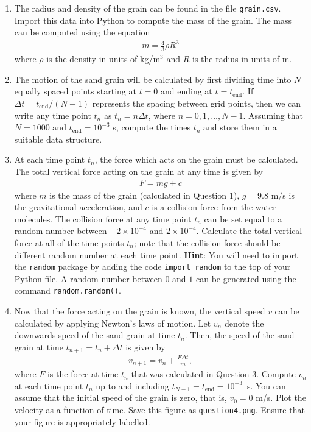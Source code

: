 \documentclass[11pt, a4paper]{article}
\begin{document}
\begin{enumerate}

\item{The radius
and density of the grain can be found in the file
{\tt grain.csv}.  Import this data into Python to
compute the mass of the grain.  The mass can be
computed using the equation
\begin{align}
m = \frac{4}{3} \rho R^3
\end{align}
where $\rho$ is the density in units of kg/m$^3$
and $R$ is the radius in units of m.} 

\item{The motion of the sand grain will be calculated by
first dividing
time into $N$ equally spaced points starting at $t = 0$ and ending at
$t = t_\text{end}$.  If $\Delta t = t_\text{end} / (N-1)$ represents the
spacing between grid points, then we can write any time point
$t_n$ as $t_n = n \Delta t$, where $n = 0, 1, \ldots, N-1$.  
Assuming that
$N = 1000$ and $t_\text{end} = 10^{-3}$ s, 
compute the times $t_n$
and store them in a suitable data structure.}

\item{At each time point $t_n$, the force which acts on the grain
must be calculated.  The total vertical force acting on the
grain at any time is given by
\begin{align}
F = m g + c \label{eqn:Fz}
\end{align}
where $m$ is the mass of the grain (calculated in Question 1), 
$g = 9.8$ m/s 
is the gravitational acceleration,
and $c$ is a collision force from the water molecules.  
The collision force at any time point $t_n$
can be set equal to a random number between 
$-2 \times 10^{-4}$ and $2 \times 10^{-4}$.
Calculate the total vertical force at all of the time points $t_n$;
note that the collision force should be different random number at
each time point.
\textbf{Hint}: You will need to import the {\tt random} package by
adding the code {\tt import random} to the top of your Python file.
A random number between $0$ and $1$ can be generated using the
command {\tt random.random()}.}


\item{Now that the force acting on the grain is known,
the vertical speed $v$ can be calculated by applying Newton's laws of
motion.  
Let $v_n$ denote the downwards speed of the sand grain at time
$t_n$.  Then, the speed 
of the sand grain at time $t_{n+1} = t_n + \Delta t$ is given by
\begin{align}
v_{n+1} = v_{n} + \frac{F \Delta t}{m}, \label{eqn:v}
\end{align}
where $F$ is the force at time $t_n$ that was calculated in
Question 3.  Compute $v_n$ at each time point  $t_n$ up to and including
$t_{N-1} = t_\text{end} = 10^{-3}$~s.  You can assume that the initial speed of the grain
is zero, that is, $v_0 = 0$ m/s.  Plot the velocity as a function of time.
Save this figure as \verb+question4.png+. Ensure that your figure
is appropriately labelled.}


\end{enumerate}
\end{document}
